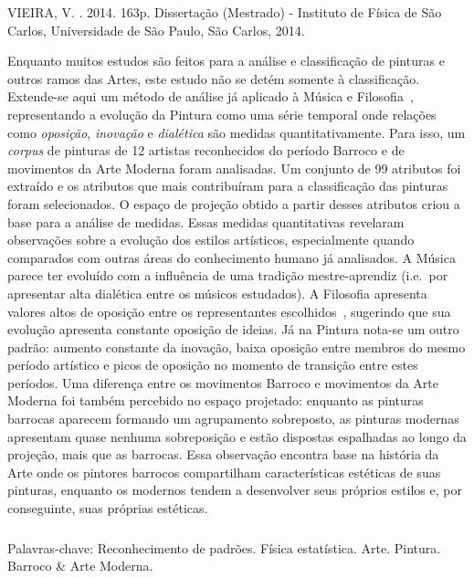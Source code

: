 \begin{resumo2}
\vspace{-10mm}
VIEIRA, V. \textbf{\ABNTtitulodata}. 2014. 163p. Dissertação (Mestrado) - Instituto de Física de São Carlos, Universidade de São Paulo, São Carlos, 2014.
\vspace{15mm}

Enquanto muitos estudos são feitos para a análise e classificação de
pinturas e outros ramos das Artes, este estudo não se detém somente à
classificação. Extende-se aqui um método de análise já aplicado à
Música e Filosofia~\cite{vieira}, representando a evolução da Pintura
como uma série temporal onde relações como \textit{oposição},
\textit{inovação} e \textit{dialética} são medidas
quantitativamente. Para isso, um \textit{corpus} de pinturas de 12
artistas reconhecidos do período Barroco e de movimentos da Arte
Moderna foram analisadas. Um conjunto de 99 atributos foi extraído e
os atributos que mais contribuíram para a classificação das pinturas
foram selecionados. O espaço de projeção obtido a partir desses
atributos criou a base para a análise de medidas. Essas medidas
quantitativas revelaram observações sobre a evolução dos estilos
artísticos, especialmente quando comparados com outras áreas do
conhecimento humano já analisados. A Música parece ter evoluído com a
influência de uma tradição mestre-aprendiz (i.e.\ por apresentar alta
dialética entre os músicos estudados). A Filosofia apresenta valores
altos de oposição entre os representantes escolhidos~\cite{vieira},
sugerindo que sua evolução apresenta constante oposição de ideias. Já
na Pintura nota-se um outro padrão: aumento constante da inovação,
baixa oposição entre membros do mesmo período artístico e picos de
oposição no momento de transição entre estes períodos. Uma diferença
entre os movimentos Barroco e movimentos da Arte Moderna foi também
percebido no espaço projetado: enquanto as pinturas barrocas aparecem
formando um agrupamento sobreposto, as pinturas modernas apresentam
quase nenhuma sobreposição e estão dispostas espalhadas ao longo da
projeção, mais que as barrocas. Essa observação encontra base na
história da Arte onde os pintores barrocos compartilham
características estéticas de suas pinturas, enquanto os modernos
tendem a desenvolver seus próprios estilos e, por conseguinte, suas
próprias estéticas.

$\phantom{linha em branco}$\\ Palavras-chave: Reconhecimento de
padrões. Física estatística. Arte. Pintura. Barroco \& Arte
Moderna. 

\end{resumo2}


